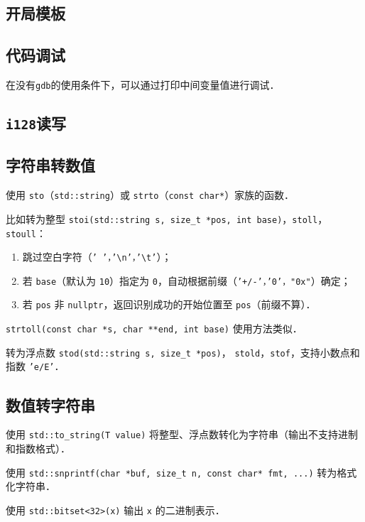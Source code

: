 \subsection{开局模板}



\newpage

\subsection{代码调试}

在没有{\tt gdb}的使用条件下，可以通过打印中间变量值进行调试．



\subsection{{\tt i128}读写}



\subsection{字符串转数值}

使用 {\tt sto}（{\tt std::string}）或 {\tt strto}（{\tt const char*}）家族的函数．

比如转为整型 {\tt stoi(std::string s, size\_t *pos, int base)}，{\tt stoll}，{\tt stoull}：

\begin{enumerate}[noitemsep]
    \item 跳过空白字符（{\tt ' '，'\textbackslash n'，'\textbackslash t'}）；
    \item 若 {\tt base}（默认为 {\tt 10}）指定为 {\tt 0}，自动根据前缀（{\tt '+/-'，'0'，"0x"}）确定；
    \item 若 {\tt pos} 非 {\tt nullptr}，返回识别成功的开始位置至 {\tt pos}（前缀不算）．
\end{enumerate}

{\tt strtoll(const char *s, char **end, int base)} 使用方法类似．

转为浮点数 {\tt stod(std::string s, size\_t *pos)}，
{\tt stold}，{\tt stof}，支持小数点和指数 {\tt 'e/E'}．



\subsection{数值转字符串}

使用 {\tt std::to\_string(T value)} 将整型、浮点数转化为字符串（输出不支持进制和指数格式）．

使用 {\tt std::snprintf(char *buf, size\_t n, const char* fmt, ...)} 转为格式化字符串．



使用 {\tt std::bitset<32>(x)} 输出 {\tt x} 的二进制表示．

\newpage
